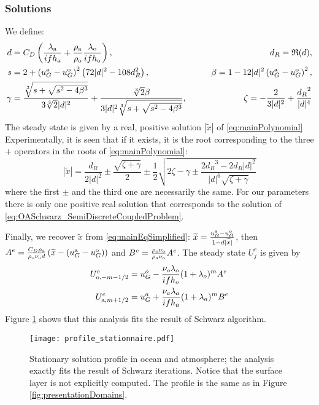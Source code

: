 \subsubsection{Solutions}
\label{sec:summary_stationnary}
We define:
\begin{equation}
    \begin{aligned}
    {d} &= C_D\left(
    \frac{\lambda_{\rm a}}{if h_{\rm a}} 
    +\frac{\rho_{\rm a}}{\rho_{\rm o}}\frac{\lambda_{\rm o}}{if h_{\rm o}} \right), \qquad &d_R = \mathfrak{R}(d),
    \\
    s &= 2 + \left(u_G^{\rm a} - u_G^{\rm o}\right)^2 \left(72 |d|^2 - 108 d_R^2 \right),
    \qquad
    &\beta = 1 - 12 |d|^2 \left(u_G^{\rm a} - u_G^{\rm o}\right)^2, \\
    \gamma &= \frac{\sqrt[3]{s+\sqrt{s^2 - 4 \beta^3}}}{3\sqrt[3]{2}|d|^2} +\frac{\sqrt[3]{2}\beta}{3|d|^2 \sqrt[3]{s+\sqrt{s^2 - 4 \beta^3}}}, 
    \qquad &\zeta = -\frac{2}{3|d|^2} + \frac{{d_R}^2}{|d|^4}
    \end{aligned}
\end{equation}
The steady state is given by a real, positive solution $|\widetilde{x}|$ of \eqref{eq:mainPolynomial}
Experimentally, it is seen that if it exists, it is the root corresponding to the three $+$ operators in the roots of \eqref{eq:mainPolynomial}:
\begin{equation}
    |\widetilde{x}| = \frac{{d_R}}{2|d|^2} \pm \frac{\sqrt{\zeta + \gamma }}{2} \pm \frac{1}{2}
    \sqrt{
    2\zeta - 
    \gamma
    \pm
    \frac{2{d_R}^3 - 2{d_R}|d|^2}{|d|^6 \sqrt{\zeta + \gamma }}
    }
\end{equation}
where the first $\pm$ and the
third one are necessarily the same.
For our parameters there is only one positive real solution that
corresponds to the solution of
\eqref{eq:OASchwarz_SemiDiscreteCoupledProblem}.
\par
Finally, we recover $\widetilde{x}$ from \eqref{eq:mainEqSimplified}: $\widetilde{x} = \frac{u_G^{\rm a} - u_G^{\rm o}}{1 - d |\widetilde{x}|}$, then $A^e = \frac{C_D \rho_{\rm a}}{\rho_{\rm o} \nu_{\rm o} d}\left(\widetilde{x} - (u_G^{\rm a} - u_G^{\rm o})\right)$ 
and
$ B^e = \frac{\rho_{\rm o} \nu_{\rm o}}{\rho_{\rm a} \nu_{\rm a}}A^e$.
The steady state $U^e_j$ is given by
\begin{equation}
	\begin{aligned}
	U^e_{{\rm o}, -m-1/2} &=
		u_G^o - \frac{\nu_o\lambda_o}{if h_o}
		(1+\lambda_o)^{m} A^e\\
	U^e_{{\rm a}, m+1/2} &= 
u_G^a + \frac{\nu_a\lambda_a}{if h_a}
		(1+\lambda_a)^{m} B^e
	\end{aligned}
\end{equation}
Figure \ref{fig:validation} shows that this analysis fits the result of Schwarz algorithm.
\begin{figure}
    \centering
    \texttt{[image: profile\_stationnaire.pdf]}
    \caption{Stationary solution profile in ocean and atmosphere;
	the analysis exactly fits the result of Schwarz iterations.
	Notice that the surface layer is not explicitly computed.
	The profile is the same as in Figure \ref{fig:presentationDomains}.}
    \label{fig:validation}
\end{figure}


